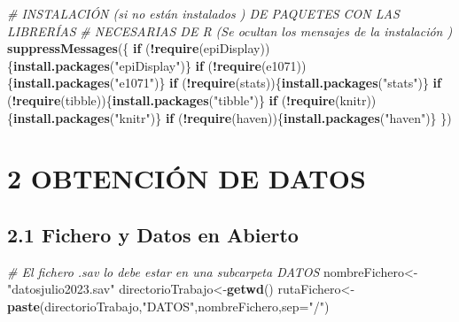 \documentclass[
  12 pt,
  a4paper,
]{article}
\newenvironment{Shaded}{\begin{snugshade}}{\end{snugshade}}
\newcommand{\AttributeTok}[1]{\textcolor[rgb]{0.13,0.29,0.53}{#1}}
\newcommand{\CommentTok}[1]{\textcolor[rgb]{0.56,0.35,0.01}{\textit{#1}}}
\newcommand{\ControlFlowTok}[1]{\textcolor[rgb]{0.13,0.29,0.53}{\textbf{#1}}}
\newcommand{\FunctionTok}[1]{\textcolor[rgb]{0.13,0.29,0.53}{\textbf{#1}}}
\newcommand{\NormalTok}[1]{#1}
\newcommand{\OtherTok}[1]{\textcolor[rgb]{0.56,0.35,0.01}{#1}}
\newcommand{\SpecialCharTok}[1]{\textcolor[rgb]{0.81,0.36,0.00}{\textbf{#1}}}
\newcommand{\StringTok}[1]{\textcolor[rgb]{0.31,0.60,0.02}{#1}}
\begin{document}
\begin{Shaded}
\begin{Highlighting}[]
\CommentTok{\# INSTALACIÓN (si no están instalados ) DE PAQUETES CON LAS LIBRERÍAS }
\CommentTok{\# NECESARIAS DE R (Se ocultan los mensajes de la instalación )}
\FunctionTok{suppressMessages}\NormalTok{(\{}
\ControlFlowTok{if}\NormalTok{ (}\SpecialCharTok{!}\FunctionTok{require}\NormalTok{(epiDisplay))\{}\FunctionTok{install.packages}\NormalTok{(}\StringTok{"epiDisplay"}\NormalTok{)\}}
\ControlFlowTok{if}\NormalTok{ (}\SpecialCharTok{!}\FunctionTok{require}\NormalTok{(e1071))\{}\FunctionTok{install.packages}\NormalTok{(}\StringTok{"e1071"}\NormalTok{)\}}
\ControlFlowTok{if}\NormalTok{ (}\SpecialCharTok{!}\FunctionTok{require}\NormalTok{(stats))\{}\FunctionTok{install.packages}\NormalTok{(}\StringTok{"stats"}\NormalTok{)\}}
\ControlFlowTok{if}\NormalTok{ (}\SpecialCharTok{!}\FunctionTok{require}\NormalTok{(tibble))\{}\FunctionTok{install.packages}\NormalTok{(}\StringTok{"tibble"}\NormalTok{)\}}
\ControlFlowTok{if}\NormalTok{ (}\SpecialCharTok{!}\FunctionTok{require}\NormalTok{(knitr))\{}\FunctionTok{install.packages}\NormalTok{(}\StringTok{"knitr"}\NormalTok{)\}}
\ControlFlowTok{if}\NormalTok{ (}\SpecialCharTok{!}\FunctionTok{require}\NormalTok{(haven))\{}\FunctionTok{install.packages}\NormalTok{(}\StringTok{"haven"}\NormalTok{)\}}
\NormalTok{\})}
\end{Highlighting}
\end{Shaded}

\newpage

\hypertarget{obtenciuxf3n-de-datos}{%
\section{2 OBTENCIÓN DE DATOS}\label{obtenciuxf3n-de-datos}}

\hypertarget{fichero-y-datos-en-abierto}{%
\subsection{2.1 Fichero y Datos en
Abierto}\label{fichero-y-datos-en-abierto}}

\begin{Shaded}
\begin{Highlighting}[]
\CommentTok{\# El fichero .sav lo debe estar en una subcarpeta DATOS}
\NormalTok{nombreFichero}\OtherTok{\textless{}{-}}\StringTok{"datosjulio2023.sav"}
\NormalTok{directorioTrabajo}\OtherTok{\textless{}{-}}\FunctionTok{getwd}\NormalTok{()}
\NormalTok{rutaFichero}\OtherTok{\textless{}{-}}\FunctionTok{paste}\NormalTok{(directorioTrabajo,}\StringTok{"DATOS"}\NormalTok{,nombreFichero,}\AttributeTok{sep=}\StringTok{"/"}\NormalTok{)}
\end{Highlighting}
\end{Shaded}
\end{document}
